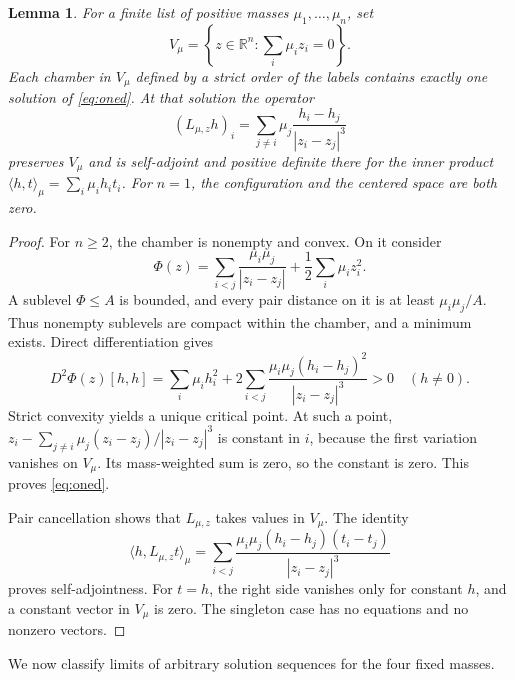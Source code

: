 \documentclass[11pt,a4paper]{amsart}
\newtheorem{lemma}[theorem]{Lemma}
\numberwithin{equation}{section}
\newcommand{\R}{\mathbb R}
\begin{document}
\begin{lemma}\label{lem:ordered-oned}
For a finite list of positive masses $\mu_1,\ldots,\mu_n$, set
\[
 V_\mu=\left\{z\in\R^n:\sum_i\mu_i z_i=0\right\}.
\]
Each chamber in $V_\mu$ defined by a strict order of the labels contains
exactly one solution of \eqref{eq:oned}. At that solution the operator
\begin{equation}\label{eq:laplacian}
 (L_{\mu,z}h)_i=\sum_{j\ne i}\mu_j\frac{h_i-h_j}{|z_i-z_j|^3}
\end{equation}
preserves $V_\mu$ and is self-adjoint and positive definite there for
the inner product $\langle h,t\rangle_\mu=\sum_i\mu_i h_it_i$.
For $n=1$, the configuration and the centered space are both zero.
\end{lemma}
\begin{proof}
For $n\ge2$, the chamber is nonempty and convex. On it consider
\[
 \Phi(z)=\sum_{i<j}\frac{\mu_i\mu_j}{|z_i-z_j|}
                  +\frac12\sum_i\mu_i z_i^2.
\]
A sublevel $\Phi\le A$ is bounded, and every pair distance on it is
at least $\mu_i\mu_j/A$. Thus nonempty sublevels are compact within
the chamber, and a minimum exists. Direct differentiation gives
\begin{equation}\label{eq:oned-hessian}
 D^2\Phi(z)[h,h]=\sum_i\mu_i h_i^2
       +2\sum_{i<j}\frac{\mu_i\mu_j(h_i-h_j)^2}{|z_i-z_j|^3}>0
       \quad(h\ne0).
\end{equation}
Strict convexity yields a unique critical point. At such a point,
$z_i-\sum_{j\ne i}\mu_j(z_i-z_j)/|z_i-z_j|^3$ is constant in $i$,
because the first variation vanishes on $V_\mu$. Its mass-weighted
sum is zero, so the constant is zero. This proves \eqref{eq:oned}.

Pair cancellation shows that $L_{\mu,z}$ takes values in $V_\mu$.
The identity
\begin{equation}\label{eq:laplacian-form}
 \langle h,L_{\mu,z}t\rangle_\mu
   =\sum_{i<j}\frac{\mu_i\mu_j(h_i-h_j)(t_i-t_j)}{|z_i-z_j|^3}
\end{equation}
proves self-adjointness. For $t=h$, the right side vanishes only for
constant $h$, and a constant vector in $V_\mu$ is zero. The singleton
case has no equations and no nonzero vectors.
\end{proof}

We now classify limits of arbitrary solution sequences for the four
fixed masses.
\end{document}
